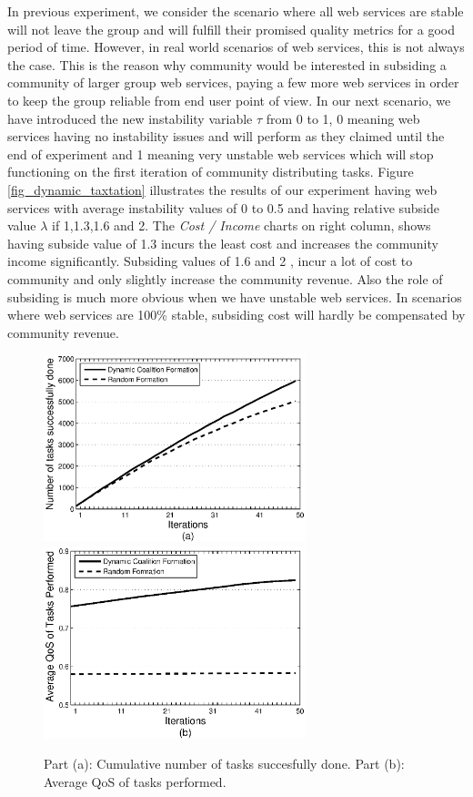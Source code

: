 \documentclass[10pt,journal,cspaper,compsoc]{IEEEtran}
\begin{document}
In previous experiment, we consider the scenario where all web services are stable will not leave the group and will fulfill their promised quality metrics for a good period of time. However, in real world scenarios of web services, this is not always the case. This is the reason why community would be interested in subsiding a community of larger group web services, paying a few more web services in order to keep the group reliable from end user point of view. In our next scenario, we have introduced the new instability variable $\tau$ from 0 to 1, 0 meaning web services having no instability issues and will perform as they claimed until the end of experiment and 1 meaning very unstable web services which will stop functioning on the first iteration of community distributing tasks. Figure \ref{fig_dynamic_taxtation} illustrates the results of our experiment having web services with average instability values of 0 to 0.5 and having relative subside value $\lambda$ if 1,1.3,1.6 and 2. The \emph{Cost / Income} charts on right column, shows having subside value of 1.3 incurs the least cost and increases the community income significantly. Subsiding values of 1.6 and 2 , incur a lot of cost to community and only slightly increase the community revenue. Also the role of subsiding is much more obvious when we have unstable web services. In scenarios where web services are 100\% stable, subsiding cost will hardly be compensated by community revenue.

\begin{figure}[!t]
\centering
\includegraphics[width=3in]{s2_task_done.eps}
\includegraphics[width=3in]{s2_task_qos.eps}
\caption{Part (a): Cumulative number of tasks succesfully done. Part
(b): Average QoS of tasks performed.} \label{performancemany}
\end{figure}
\end{document}
